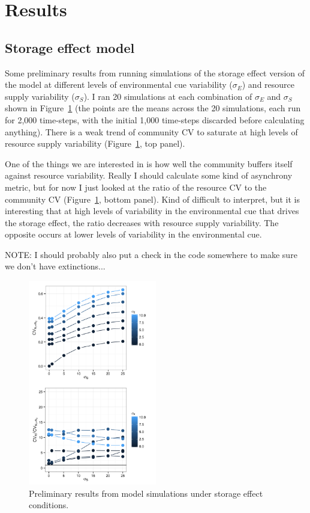 \documentclass[12pt]{article}
\begin{document}
\section{Results}
\subsection{Storage effect model}
Some preliminary results from running simulations of the storage effect version of the model at different levels of environmental cue variability ($\sigma_{E}$) and resource supply variability ($\sigma_{S}$). I ran 20 simulations at each combination of $\sigma_{E}$ and $\sigma_{S}$ shown in Figure~\ref{fig:storeEffSims} (the points are the means across the 20 simulations, each run for 2,000 time-steps, with the initial 1,000 time-steps discarded before calculating anything). There is a weak trend of community CV to saturate at high levels of resource supply variability (Figure~\ref{fig:storeEffSims}, top panel). 

One of the things we are interested in is how well the community buffers itself against resource variability. Really I should calculate some kind of asynchrony metric, but for now I just looked at the ratio of the resource CV to the community CV (Figure~\ref{fig:storeEffSims}, bottom panel). Kind of difficult to interpret, but it is interesting that at high levels of variability in the environmental cue that drives the storage effect, the ratio decreases with resource supply variability. The opposite occurs at lower levels of variability in the environmental cue.

NOTE: I should probably also put a check in the code somewhere to make sure we don't have extinctions...

\begin{figure}
\centering
\includegraphics[width=0.5\textwidth]{"CV_TwoPanel"}
\caption{Preliminary results from model simulations under storage effect conditions.}
 \label{fig:storeEffSims}
\end{figure}
\end{document}
